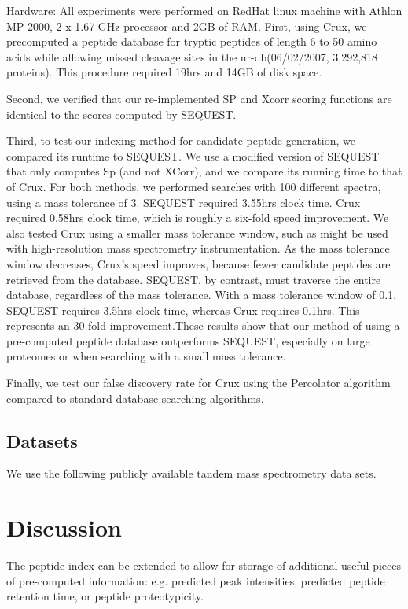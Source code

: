 \documentclass{bioinfo}
\begin{document}
Hardware: All experiments were performed on RedHat linux machine with
Athlon MP 2000, 2 x 1.67 GHz processor and 2GB of RAM.  First, using
Crux, we precomputed a peptide database for tryptic peptides of length
6 to 50 amino acids while allowing missed cleavage sites in the
nr-db(06/02/2007, 3,292,818 proteins). This procedure required 19hrs
and 14GB of disk space.

Second, we verified that our re-implemented SP and Xcorr scoring
functions are identical to the scores computed by SEQUEST.

Third, to test our indexing method for candidate peptide generation,
we compared its runtime to SEQUEST.  We use a modified version of
SEQUEST that only computes Sp (and not XCorr), and we compare its
running time to that of Crux.  For both methods, we performed searches
with 100 different spectra, using a mass tolerance of 3.  SEQUEST
required 3.55hrs clock time. Crux required 0.58hrs clock time, which
is roughly a six-fold speed improvement. We also tested Crux using a
smaller mass tolerance window, such as might be used with
high-resolution mass spectrometry instrumentation.  As the mass
tolerance window decreases, Crux's speed improves, because fewer
candidate peptides are retrieved from the database.  SEQUEST, by
contrast, must traverse the entire database, regardless of the mass
tolerance.  With a mass tolerance window of 0.1, SEQUEST requires
3.5hrs clock time, whereas Crux requires 0.1hrs.  This represents an
30-fold improvement.These results show that our method of using a
pre-computed peptide database outperforms SEQUEST, especially on large
proteomes or when searching with a small mass tolerance.

Finally, we test our false discovery rate for Crux using the
Percolator algorithm compared to standard database searching
algorithms.

\subsection*{Datasets}

We use the following publicly available tandem mass spectrometry data
sets.

\section{Discussion}

The peptide index can be extended to allow for
storage of additional useful pieces of pre-computed information: 
e.g.  predicted peak intensities, predicted peptide retention time,
or peptide proteotypicity.  %
\end{document}
